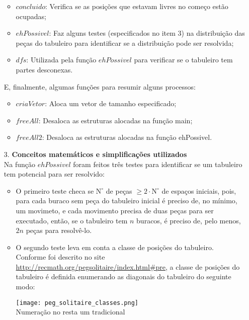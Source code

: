 \documentclass[12pt, a4paper]{article} %
\begin{document}
\begin{enumerate}
\begin{itemize}
\item $concluido$: Verifica se as posições que estavam livres no começo estão ocupadas;
\item $ehPossivel$: Faz alguns testes (especificados no item 3) na distribuição das peças do tabuleiro para identificar se a distribuição pode ser resolvida;
\item $dfs$: Utilizada pela função $ehPossivel$ para verificar se o tabuleiro tem partes desconexas.
\end{itemize}
E, finalmente, algumas funções para resumir alguns processos:
\begin{itemize}
\item $criaVetor$: Aloca um vetor de tamanho especificado;
\item $freeAll$: Desaloca as estruturas alocadas na função main;
\item $freeAll2$: Desaloca as estruturas alocadas na função ehPossivel.\\
\end{itemize}
\large
\item[3.]\textbf{Conceitos matemáticos e simplificações utilizados}
\normalsize\\[0.5cm]
Na função $ehPossivel$ foram feitos três testes para identificar se um tabuleiro tem potencial para ser resolvido:
\begin{itemize}
\item O primeiro teste checa se $\text{N}^\circ$ de peças $\geqslant 2\cdot \text{N}^\circ$ de espaços iniciais, pois, para cada buraco sem peça do tabuleiro inicial é preciso de, no mínimo, um movimeto, e cada movimento precisa de duas peças para ser executado, então, se o tabuleiro tem $n$ buracos, é preciso de, pelo menos, $2n$ peças para resolvê-lo.
\item O segundo teste leva em conta a classe de posições do tabuleiro. Conforme foi descrito no site \url{http://recmath.org/pegsolitaire/index.html#pre}, a classe de posições do tabuleiro é definida enumerando as diagonais do tabuleiro do seguinte modo:\\
\begin{center}
\texttt{[image: peg\_solitaire\_classes.png]}\\
Numeração no resta um tradicional
\end{center}

\end{itemize}
\end{enumerate}
\end{document}
